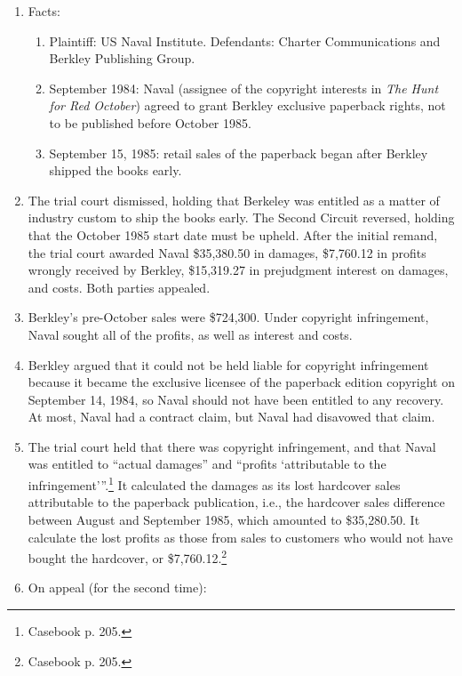 \begin{enumerate}
    \item Facts:
    \begin{enumerate}
        \item Plaintiff: US Naval Institute. Defendants: Charter Communications 
        and Berkley Publishing Group.
        \item September 1984: Naval (assignee of the copyright interests in 
        \emph{The Hunt for Red October}) agreed to grant Berkley exclusive 
        paperback rights, not to be published before October 1985.
        \item September 15, 1985: retail sales of the paperback began after 
        Berkley shipped the books early.
    \end{enumerate}
    \item The trial court dismissed, holding that Berkeley was entitled as a 
    matter of industry custom to ship the books early. The Second Circuit 
    reversed, holding that the October 1985 start date must be upheld. After 
    the initial remand, the trial court awarded Naval \$35,380.50 in damages, 
    \$7,760.12 in profits wrongly received by Berkley, \$15,319.27 in 
    prejudgment interest on damages, and costs. Both parties appealed.
    \item Berkley's pre-October sales were \$724,300. Under copyright 
    infringement, Naval sought all of the profits, as well as interest and 
    costs.
    \item Berkley argued that it could not be held liable for copyright 
    infringement because it became the exclusive licensee of the paperback 
    edition copyright on September 14, 1984, so Naval should not have been 
    entitled to any recovery. At most, Naval had a contract claim, but Naval 
    had disavowed that claim.
    \item The trial court held that there was copyright infringement, and that 
    Naval was entitled to ``actual damages'' and \enquote{profits 
    `attributable to the infringement'}.\footnote{Casebook p. 205.} It 
    calculated the damages as its lost hardcover sales attributable to the 
    paperback publication, i.e., the hardcover sales difference between August 
    and September 1985, which amounted to \$35,280.50. It calculate the lost 
    profits as those from sales to customers who would not have bought the 
    hardcover, or \$7,760.12.\footnote{Casebook p. 205.}
    \item On appeal (for the second time):
    \begin{enumerate}

\end{enumerate}
\end{enumerate}
